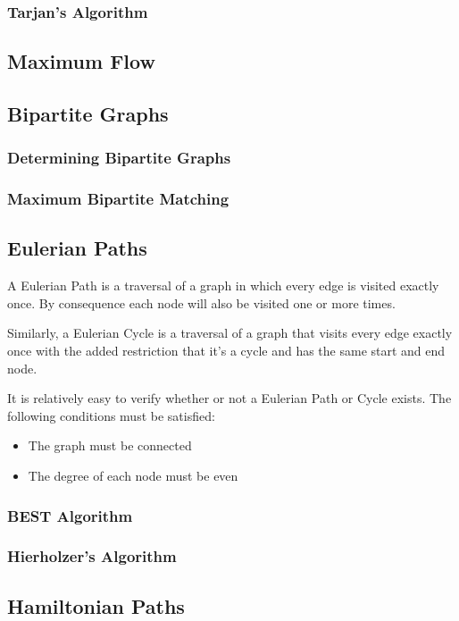 \subsubsection{Tarjan's Algorithm}
\subsection{Maximum Flow}
\subsection{Bipartite Graphs}
\subsubsection{Determining Bipartite Graphs}
\subsubsection{Maximum Bipartite Matching}
\subsection{Eulerian Paths}

A Eulerian Path is a traversal of a graph in which every edge is visited exactly once. By consequence each node will also be visited one or more times.

Similarly, a Eulerian Cycle is a traversal of a graph that visits every edge exactly once with the added restriction that it's a cycle and has the same start and end node.

It is relatively easy to verify whether or not a Eulerian Path or Cycle exists. The following conditions must be satisfied:
\begin{itemize}
\item The graph must be connected
\item The degree of each node must be even
\end{itemize}

\subsubsection{BEST Algorithm}
\subsubsection{Hierholzer's Algorithm}
\subsection{Hamiltonian Paths}

